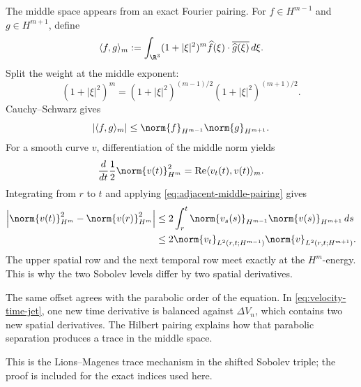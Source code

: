The middle space appears from an exact Fourier pairing.  For
\(f\in H^{m-1}\) and \(g\in H^{m+1}\), define
\begin{equation*}
 \langle f,g\rangle_m
 :=\int_{\R^3}(1+|\xi|^2)^m
   \widehat f(\xi)\cdot\overline{\widehat g(\xi)}\,d\xi.
\end{equation*}
Split the weight at the middle exponent:
\begin{equation*}
 (1+|\xi|^2)^m
 =(1+|\xi|^2)^{(m-1)/2}
  (1+|\xi|^2)^{(m+1)/2}.
\end{equation*}
Cauchy--Schwarz gives
\begin{equation}
 |\langle f,g\rangle_m|
 \le\norm{f}_{H^{m-1}}\norm{g}_{H^{m+1}}.
 \label{eq:adjacent-middle-pairing}
\end{equation}
For a smooth curve \(v\), differentiation of the middle norm yields
\begin{equation*}
 \frac d{dt}\frac12\norm{v(t)}_{H^m}^2
 =\operatorname{Re}\langle v_t(t),v(t)\rangle_m.
\end{equation*}
Integrating from \(r\) to \(t\) and applying
\eqref{eq:adjacent-middle-pairing} gives
\begin{align}
 \left|
 \norm{v(t)}_{H^m}^2-\norm{v(r)}_{H^m}^2
 \right|
 &\le2\int_r^t
 \norm{v_s(s)}_{H^{m-1}}
 \norm{v(s)}_{H^{m+1}}\,ds
 \notag\\
 &\le2
 \norm{v_t}_{L^2(r,t;H^{m-1})}
 \norm{v}_{L^2(r,t;H^{m+1})}.
 \label{eq:adjacent-norm-variation}
\end{align}
The upper spatial row and the next temporal row meet exactly at the
\(H^m\)-energy.  This is why the two Sobolev levels differ by two spatial
derivatives.

The same offset agrees with the parabolic order of the equation.  In
\eqref{eq:velocity-time-jet}, one new time derivative is balanced against
\(\Delta V_n\), which contains two new spatial derivatives.  The Hilbert
pairing explains how that parabolic separation produces a trace in the middle
space.

This is the Lions--Magenes trace mechanism in the shifted Sobolev triple; the
proof is included for the exact indices used here.

